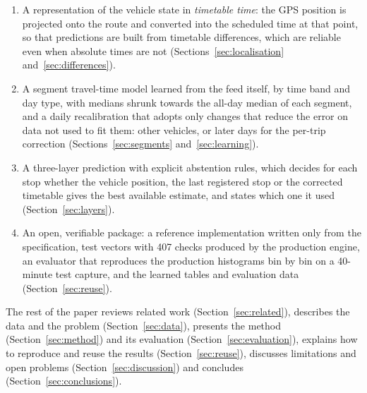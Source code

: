 \documentclass[preprint,11pt,nonatbib]{elsarticle}
\begin{document}
\begin{enumerate}
  \item A representation of the vehicle state in \emph{timetable time}: the GPS position is projected onto the route
        and converted into the scheduled time at that point, so that predictions are built from timetable
        differences, which are reliable even when absolute times are not (Sections~\ref{sec:localisation}
        and~\ref{sec:differences}).
  \item A segment travel-time model learned from the feed itself, by time band and day type, with medians shrunk
        towards the all-day median of each segment, and a daily recalibration that adopts only changes that reduce
        the error on data not used to fit them: other vehicles, or later days for the per-trip correction
        (Sections~\ref{sec:segments} and~\ref{sec:learning}).
  \item A three-layer prediction with explicit abstention rules, which decides for each stop whether the vehicle
        position, the last registered stop or the corrected timetable gives the best available estimate, and states
        which one it used (Section~\ref{sec:layers}).
  \item An open, verifiable package: a reference implementation written only from the specification, test
        vectors with 407 checks produced by the production engine, an evaluator that reproduces the production
        histograms bin by bin on a 40-minute test capture, and the learned tables and evaluation data (Section~\ref{sec:reuse}).
\end{enumerate}

\noindent The rest of the paper reviews related work (Section~\ref{sec:related}), describes the data and the problem
(Section~\ref{sec:data}), presents the method (Section~\ref{sec:method}) and its evaluation
(Section~\ref{sec:evaluation}), explains how to reproduce and reuse the results (Section~\ref{sec:reuse}), discusses
limitations and open problems (Section~\ref{sec:discussion}) and concludes (Section~\ref{sec:conclusions}).
\end{document}

